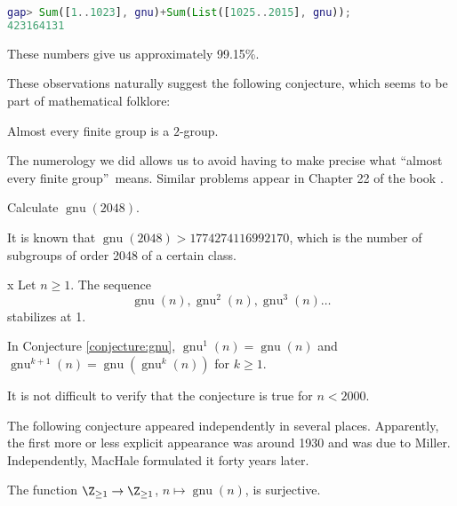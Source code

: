 
\begin{lstlisting}[language=gap]
gap> Sum([1..1023], gnu)+Sum(List([1025..2015], gnu));
423164131
\end{lstlisting}

These numbers give us approximately 99.15\%.

These observations naturally suggest the following conjecture, which seems to be part of mathematical folklore:

\begin{conjecture}
Almost every finite group is a $2$-group.
\end{conjecture}

The numerology we did allows us to avoid having to make precise what \textquotedblleft almost every finite group\textquotedblright\ means. Similar problems appear in Chapter 22 of the book \cite{MR2382539}.

\begin{problem}
Calculate $\operatorname{gnu}(2048)$.
\end{problem}

It is known that $\operatorname{gnu}(2048)>1774274116992170$, which is the number of subgroups of order 2048 of a certain class.

\begin{conjecture}
\label{conjecture:gnu}x
Let $n\geq1$. The sequence
\[
\operatorname{gnu}(n),\operatorname{gnu}^2(n),\operatorname{gnu}^3(n)\dots
\]
stabilizes at 1.
\end{conjecture}

In Conjecture \ref{conjecture:gnu}, 
$\operatorname{gnu}^{1}(n)=\operatorname{gnu}(n)$ and 
$\operatorname{gnu}^{k+1}(n)=\operatorname{gnu}(\operatorname{gnu}^k(n))$ for $k\geq1$. 

It is not difficult to verify that the conjecture is true for $n<2000$.

The following conjecture appeared independently in several places. Apparently, the first more or less explicit appearance was around 1930 and was due to Miller. Independently, MacHale formulated it forty years later.

\begin{conjecture}
The function $\Z_{\geq1}\to\Z_{\geq1}$, 
$n\mapsto\operatorname{gnu}(n)$, is surjective.
\end{conjecture}

